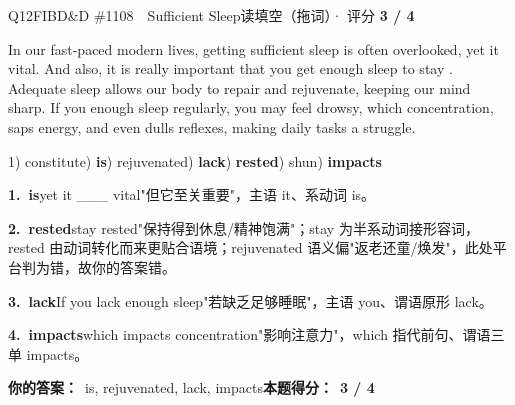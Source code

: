 \begin{qblock}{Q12\quad FIBD\&D \#1108\ \ Sufficient Sleep}{读填空（拖词）· 评分 \textcolor{cAccent}{\bfseries 3 / 4}}
\begin{promptbox}
In our fast-paced modern lives, getting sufficient sleep is often overlooked, yet it  vital. And also, it is really important that you get enough sleep to stay . Adequate sleep allows our body to repair and rejuvenate, keeping our mind sharp. If you  enough sleep regularly, you may feel drowsy, which  concentration, saps energy, and even dulls reflexes, making daily tasks a struggle.
\end{promptbox}
{\small 1) constitute) \textbf{is}) rejuvenated) \textbf{lack}) \textbf{rested}) shun) \textbf{impacts}}
\begin{notebox}\footnotesize
\textbf{1.\ is}\quad yet it \_\_\_ vital"但它至关重要"，主语 it、系动词 is。\par\smallskip
\textbf{2.\ rested}\quad stay rested"保持得到休息/精神饱满"；stay 为半系动词接形容词，rested 由动词转化而来更贴合语境；rejuvenated 语义偏"返老还童/焕发"，此处平台判为错，故你的答案错。\par\smallskip
\textbf{3.\ lack}\quad If you lack enough sleep"若缺乏足够睡眠"，主语 you、谓语原形 lack。\par\smallskip
\textbf{4.\ impacts}\quad which impacts concentration"影响注意力"，which 指代前句、谓语三单 impacts。
\end{notebox}
\smallskip
\textbf{你的答案：}\ is, {\color{cWrong}rejuvenated}, lack, impacts\qquad\textbf{本题得分：}\ {\color{cAccent}\bfseries 3 / 4}
\end{qblock}

